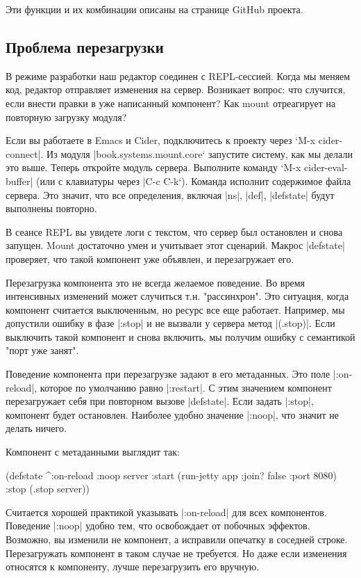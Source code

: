 Эти функции и их комбинации описаны на странице GitHub проекта.

\subsection{Проблема перезагрузки}

В режиме разработки наш редактор соединен с REPL-сессией. Когда мы меняем код,
редактор отправляет изменения на сервер. Возникает вопрос: что случится, если
внести правки в уже написанный компонент? Как mount отреагирует на повторную
загрузку модуля?

Если вы работаете в Emacs и Cider, подключитесь к проекту через `M-x
cider-connect\spverb|. Из модуля |book.systems.mount.core` запустите систему, как мы
делали это выше. Теперь откройте модуль сервера. Выполните команду `M-x
cider-eval-buffer\spverb| (или с клавиатуры через |C-c C-k`). Команда исполнит
содержимое файла сервера. Это значит, что все определения, включая \spverb|ns|, \spverb|def|,
\spverb|defstate| будут выполнены повторно.

В сеансе REPL вы увидете логи с текстом, что сервер был остановлен и снова
запущен. Mount достаточно умен и учитывает этот сценарий. Макрос \spverb|defstate|
проверяет, что такой компонент уже объявлен, и перезагружает его.

Перезагрузка компонента это не всегда желаемое поведение. Во время интенсивных
изменений может случиться т.н. "рассинхрон". Это ситуация, когда компонент
считается выключенным, но ресурс все еще работает. Например, мы допустили ошибку
в фазе \spverb|:stop| и не вызвали у сервера метод \spverb|(.stop)|. Если выключить такой
компонент и снова включить, мы получим ошибку с семантикой "порт уже занят".

Поведение компонента при перезагрузке задают в его метаданных. Это поле
\spverb|:on-reload|, которое по умолчанию равно \spverb|:restart|. С этим значением компонент
перезагружает себя при повторном вызове \spverb|defstate|. Если задать \spverb|:stop|,
компонент будет остановлен. Наиболее удобно значение \spverb|:noop|, что значит не
делать ничего.

Компонент с метаданными выглядит так:

\begin{code}
(defstate ^{:on-reload :noop} server
  :start (run-jetty app {:join? false :port 8080})
  :stop (.stop server))
\end{code}

Считается хорошей практикой указывать \spverb|:on-reload| для всех
компонентов. Поведение \spverb|:noop| удобно тем, что освобождает от побочных
эффектов. Возможно, вы изменили не компонент, а исправили опечатку в соседней
строке. Перезагружать компонент в таком случае не требуется. Но даже если
изменения относятся к компоненту, лучше перезагрузить его вручную.

